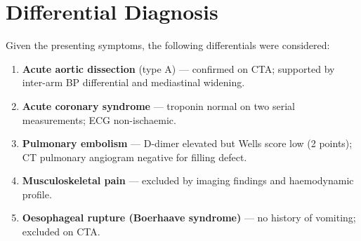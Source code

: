 \section{Differential Diagnosis}

Given the presenting symptoms, the following differentials were considered:

\begin{enumerate}
  \item \textbf{Acute aortic dissection} (type A) — confirmed on CTA; supported by
        inter-arm BP differential and mediastinal widening.
  \item \textbf{Acute coronary syndrome} — troponin normal on two serial measurements;
        ECG non-ischaemic.
  \item \textbf{Pulmonary embolism} — D-dimer elevated but Wells score low (2 points);
        CT pulmonary angiogram negative for filling defect.
  \item \textbf{Musculoskeletal pain} — excluded by imaging findings and haemodynamic
        profile.
  \item \textbf{Oesophageal rupture (Boerhaave syndrome)} — no history of vomiting;
        excluded on CTA.
\end{enumerate}

